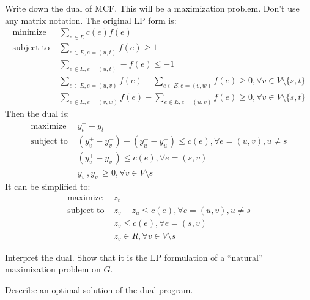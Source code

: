 \documentclass[11pt,a4paper,oneside]{article}
\begin{document}
\begin{problem}{3}
	\statement
    Write down the dual of MCF. This will be a maximization problem. Don't use any matrix notation.
    \solution
    The original LP form is:
	$$	
	\begin {align*}
	\text{minimize } & \sum_{e\in E}c(e)f(e) \\
	\text{subject to } & \sum_{e\in E,e=(u,t)}f(e)\geq 1 \\
	& \sum_{e\in E,e=(u,t)}-f(e)\leq -1 \\
	& \sum_{e\in E,e=(u,v)}f(e)-\sum_{e\in E,e=(v,w)}f(e)\geq 0, 
	\forall v\in V\setminus \{s,t\} \\
	& \sum_{e\in E,e=(v,w)}f(e)-\sum_{e\in E,e=(u,v)}f(e)\geq 0, 
	\forall v\in V\setminus \{s,t\} 
	\end {align*}
	$$
	Then the dual is:
	$$
	\begin {align*}
	\text{maximize } & y_t^+-y_t^- \\
	\text{subject to } & (y_v^+-y_v^-)-(y_u^+-y_u^-)\leq c(e),\forall e=(u,v),u\neq s\\
	& (y_v^+-y_v^-)\leq c(e),\forall e=(s,v)\\
	& y_v^+,y_v^-\geq 0,\forall v\in V\setminus s 
	\end {align*}
	$$
	It can be simplified to:
	$$
	\begin {align*}
	\text{maximize } & z_t \\
	\text{subject to } & z_v-z_u\leq c(e),\forall e=(u,v),u\neq s\\
	& z_v\leq c(e),\forall e=(s,v)\\
	& z_v\in R,\forall v\in V\setminus s 
	\end {align*}
	$$
\end{problem}
\begin{problem}{4}
	\statement
   Interpret the dual. Show that it is the LP formulation of a ``natural'' maximization problem on $G$.
   \solution
	
\end{problem}
\begin{problem}{5}
	\statement
  Describe an optimal solution of the dual program.
    \solution
	
\end{problem}
\end{document}
